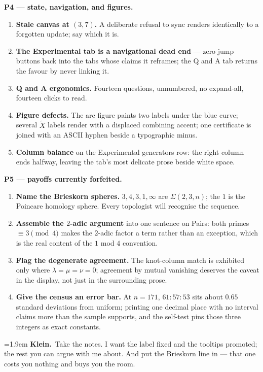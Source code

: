 \documentclass[11pt]{article}
\newcommand{\Kle}[1]{\par\smallskip\noindent\hangindent=1.9em\hangafter=1%
  \textcolor{klecol}{\textbf{Klein.}}~#1\par}
\newcommand{\walkbeat}[1]{\par\smallskip{\centering\small\itshape\textcolor{beatgray}{#1}\par}\smallskip}
\begin{document}
\textbf{P4 --- state, navigation, and figures.}
\begin{enumerate}[leftmargin=1.4em,itemsep=2pt,resume]
\item \textbf{Stale canvas at $(3,7)$.} A deliberate refusal to sync renders identically to a forgotten update; say which it is.
\item \textbf{The Experimental tab is a navigational dead end} --- zero jump buttons back into the tabs whose claims it reframes; the Q and A tab returns the favour by never linking it.
\item \textbf{Q and A ergonomics.} Fourteen questions, unnumbered, no expand-all, fourteen clicks to read.
\item \textbf{Figure defects.} The arc figure paints two labels under the blue curve; several $\tilde{X}$ labels render with a displaced combining accent; one certificate is joined with an ASCII hyphen beside a typographic minus.
\item \textbf{Column balance} on the Experimental generators row: the right column ends halfway, leaving the tab's most delicate prose beside white space.
\end{enumerate}

\textbf{P5 --- payoffs currently forfeited.}
\begin{enumerate}[leftmargin=1.4em,itemsep=2pt,resume]
\item \textbf{Name the Brieskorn spheres.} $3, 4, 3, 1, \infty$ are $\Sigma(2,3,n)$; the $1$ is the Poincare homology sphere. Every topologist will recognise the sequence.
\item \textbf{Assemble the $2$-adic argument} into one sentence on Pairs: both primes $\equiv 3 \pmod 4$ makes the $2$-adic factor a term rather than an exception, which is the real content of the $1$ mod $4$ convention.
\item \textbf{Flag the degenerate agreement.} The knot-column match is exhibited only where $\lambda = \mu = \nu = 0$; agreement by mutual vanishing deserves the caveat in the display, not just in the surrounding prose.
\item \textbf{Give the census an error bar.} At $n = 171$, $61:57:53$ sits about $0.65$ standard deviations from uniform; printing one decimal place with no interval claims more than the sample supports, and the self-test pins those three integers as exact constants.
\end{enumerate}

\walkbeat{Klein closes the notebook and pushes it across the table.}

\Kle{Take the notes. I want the label fixed and the tooltips promoted; the rest you can argue with me about. And put the Brieskorn line in --- that one costs you nothing and buys you the room.}
\end{document}
